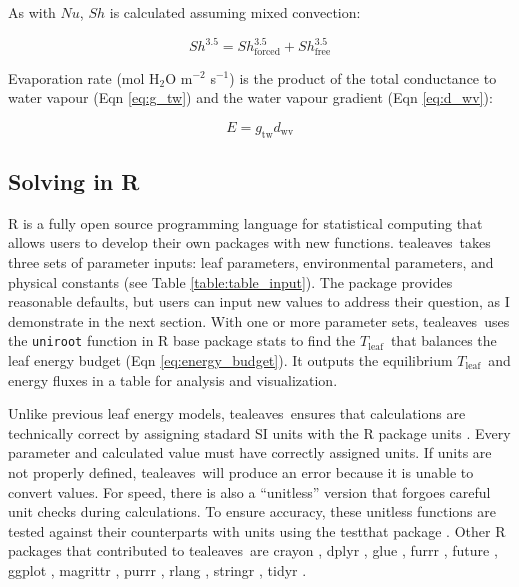 \documentclass[11pt, oneside]{article}
\newcommand{\pkg}[1]{{\fontseries{b}\selectfont #1}}
\newcommand{\code}[1]{{\texttt{#1}}}
\newcommand{\tealeaves}{\pkg{tealeaves}}
\newcommand{\tleaf}{$T_\mathrm{leaf}$}
\begin{document}
As with $\mathit{Nu}$, $\mathit{Sh}$ is calculated assuming mixed convection:

\begin{equation}
  \label{eq:sherwood}
  \mathit{Sh} ^ {3.5} = \mathit{Sh}_\mathrm{forced} ^ {3.5} + \mathit{Sh}_\mathrm{free} ^ {3.5}
\end{equation}

Evaporation rate (mol H$_2$O m$^{-2}$ s$^{-1}$) is the product of the total conductance to water vapour (Eqn \ref{eq:g_tw}) and the water vapour gradient (Eqn \ref{eq:d_wv}):

\begin{equation}
  E = g_\mathrm{tw} d_\mathrm{wv}
\end{equation}

\subsection*{Solving in R}

R is a fully open source programming language for statistical computing that allows users to develop their own packages with new functions. \tealeaves~takes three sets of parameter inputs: leaf parameters, environmental parameters, and physical constants (see Table \ref{table:table_input}). The package provides reasonable defaults, but users can input new values to address their question, as I demonstrate in the next section. With one or more parameter sets, \tealeaves~uses the \code{uniroot} function in R base package \pkg{stats} to find the \tleaf~that balances the leaf energy budget (Eqn \ref{eq:energy_budget}). It outputs the equilibrium \tleaf~and energy fluxes in a table for analysis and visualization.

Unlike previous leaf energy models, \tealeaves~ensures that calculations are technically correct by assigning stadard SI units with the R package \pkg{units} \cite{Pebesma_etal_2016}. Every parameter and calculated value must have correctly assigned units. If units are not properly defined, \tealeaves~will produce an error because it is unable to convert values. For speed, there is also a ``unitless'' version that forgoes careful unit checks during calculations. To ensure accuracy, these unitless functions are tested against their counterparts with units using the \pkg{testthat} package \citep{Wickham_2011}. Other R packages that contributed to \tealeaves~are \pkg{crayon} \citep{Csardi_2017}, \pkg{dplyr} \citep{Wickham_etal_2018}, \pkg{glue} \citep{Hester_2018}, \pkg{furrr} \citep{Vaughan_Dancho_2018}, \pkg{future} \citep{Bengtsson_2018}, \pkg{ggplot} \citep{Wickham_2016}, \pkg{magrittr} \citep{Bache_Wickham_2014}, \pkg{purrr} \citep{Henry_Wickham_2018b}, \pkg{rlang} \citep{Henry_Wickham_2018a}, \pkg{stringr} \citep{Wickham_2018}, \pkg{tidyr} \citep{Wickham_Henry_2018}.
\end{document}
